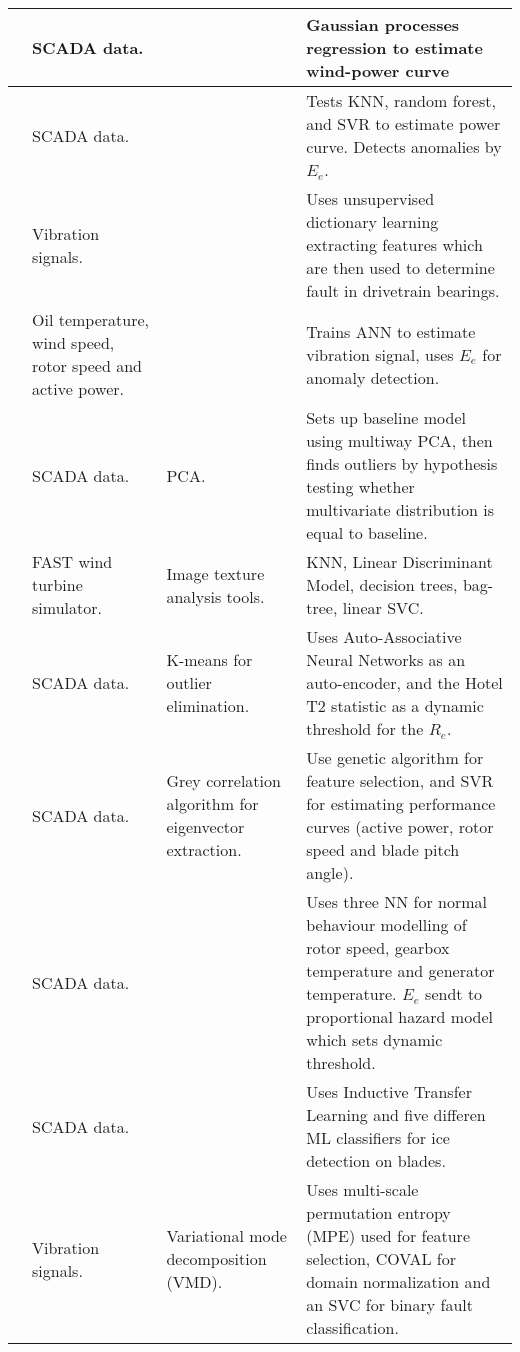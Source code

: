 \begin{longtable}{p{}p{}p{}p{}}
    \cite{GP_operational_curve_monitoring} & SCADA data. & & Gaussian processes regression to estimate wind-power curve \\ \hline
    \cite{high_freq_scada_perf_monit_sensitivity} & SCADA data. & & Tests KNN, random forest, and SVR to estimate power curve. Detects anomalies by $E_e$. \\ \hline
    \cite{dict_learning_monitor_wt_drivetrain_bearing} & Vibration signals. & & Uses unsupervised dictionary learning extracting features which are then used to determine fault in drivetrain bearings. \\ \hline
    \cite{ANN_damage_detection_gearbox_wt} & Oil temperature, wind speed, rotor speed and active power. & & Trains ANN to estimate vibration signal, uses $E_e$ for anomaly detection. \\ \hline
    \cite{multiway_PCA_multivar_inference_cm_wt} & SCADA data. & PCA. & Sets up baseline model using multiway PCA, then finds outliers by hypothesis testing whether multivariate distribution is equal to baseline. \\ \hline
    \cite{image_texture_analysis_FD_wt} & FAST wind turbine simulator. & Image texture analysis tools. & KNN, Linear Discriminant Model, decision trees, bag-tree, linear SVC.\\ \hline
    \cite{auto_associative_nn_wt_fault_detection} & SCADA data. & K-means for outlier elimination. & Uses Auto-Associative Neural Networks as an auto-encoder, and the Hotel T2 statistic as a dynamic threshold for the $R_e$.\\ \hline
    \cite{abnormal_detection_scada_data_mining} & SCADA data. & Grey correlation algorithm for eigenvector extraction. & Use genetic algorithm for feature selection, and SVR for estimating performance curves (active power, rotor speed and blade pitch angle). \\ \hline
    \cite{health_cond_model_nn_proportional_hazard_models} & SCADA data. & & Uses three NN for normal behaviour modelling of rotor speed, gearbox temperature and generator temperature. $E_e$ sendt to proportional hazard model which sets dynamic threshold. \\ \hline
    \cite{ice_detection_using_ITL} & SCADA data. & & Uses Inductive Transfer Learning and five differen ML classifiers for ice detection on blades. \\ \hline
    \cite{VMD_MPE_COVAL_fault_detection_gearbox} & Vibration signals. & Variational mode decomposition (VMD). & Uses multi-scale permutation entropy (MPE) used for feature selection, COVAL for domain normalization and an SVC for binary fault classification.\\ \hline

\end{longtable}
